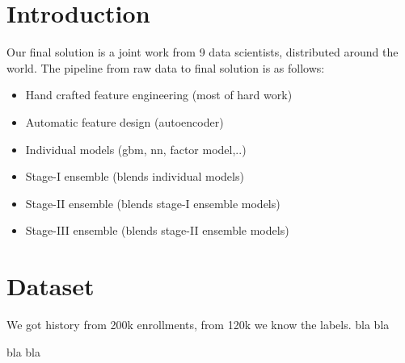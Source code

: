 \section{Introduction}
Our final solution is a joint work from 9 data scientists, distributed around the world.
The pipeline from raw data to final solution is as follows:
\begin{itemize}
  \item Hand crafted feature engineering (most of hard work)
  \item Automatic feature design (autoencoder)
  \item Individual models (gbm, nn, factor model,..)
  \item Stage-I ensemble (blends individual models)
  \item Stage-II ensemble (blends stage-I ensemble models)
  \item Stage-III ensemble (blends stage-II ensemble models)
\end{itemize}


\section{Dataset}
We got history from 200k enrollments, from 120k we know the labels.
bla bla

bla bla